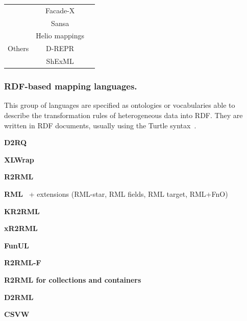 \begin{table}[t]
\begin{tabular}{c|c|c}
                              & Facade-X        & \parencite{asprino2023sparql-anything,sparqlanything}\\ \cline{2-3}
                              & Sansa            & \parencite{stadler2023spark}\\ \hline
\multirow{3}{*}{Others}       & Helio mappings  & \parencite{cimmino2022helio}\\ \cline{2-3} 
                              & D-REPR          & \parencite{Vu2019d-repr}\\ \cline{2-3} 
                              & ShExML          & \parencite{Garcia-Gonzalez2020shexml,shexml}\\  \hline
\end{tabular}
\end{table}




\subsubsection{RDF-based mapping languages.} 

This group of languages are specified as ontologies or vocabularies able to describe the transformation rules of heterogeneous data into RDF. They are written in RDF documents, usually using the Turtle syntax~\parencite{turtle}. 



\noindent\textbf{D2RQ}~\parencite{bizer2004d2rq}

\noindent\textbf{XLWrap}~\parencite{langegger2009xlwrap}

\noindent\textbf{R2RML}~\parencite{das2012r2rml} 

\noindent\textbf{RML}~\parencite{Dimou2014rml} + extensions (RML-star, RML fields, RML target, RML+FnO)

\noindent\textbf{KR2RML}~\parencite{slepicka2015kr2rml}

\noindent\textbf{xR2RML}~\parencite{michel2015xr2rml}

\noindent\textbf{FunUL}~\parencite{junior2016funul}

\noindent\textbf{R2RML-F}~\parencite{debruyne2016r2rmlf}

\noindent\textbf{R2RML for collections and containers}~\parencite{debruyne2017R2RML-collections}

\noindent\textbf{D2RML}~\parencite{chortaras2018d2rml}

\noindent\textbf{CSVW}~\parencite{Tennison2015csvw}

